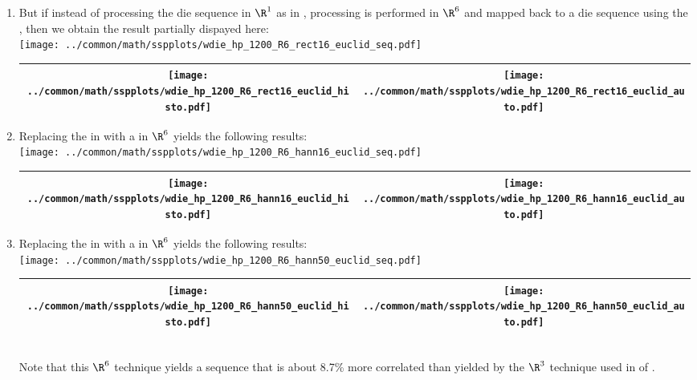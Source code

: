 \begin{example}
\begin{enumerate}
  \item \label{item:wdie_hp_R6_rect16_euclid}
        But if instead of processing the die sequence in $\R^1$ as in ,
        processing is performed in $\R^6$ 
        and mapped back to a die sequence using the ,
        then we obtain the result partially dispayed here:
        \\\texttt{[image: ../common/math/sspplots/wdie\_hp\_1200\_R6\_rect16\_euclid\_seq.pdf]}
        \\\begin{tabular}{|>{\scs}c|>{\scs}c|}
             \hline
             \texttt{[image: ../common/math/sspplots/wdie\_hp\_1200\_R6\_rect16\_euclid\_histo.pdf]}
            &\texttt{[image: ../common/math/sspplots/wdie\_hp\_1200\_R6\_rect16\_euclid\_auto.pdf]}
           \\\hline
        \end{tabular}

  \item \label{item:wdie_hp_R6_hann16_euclid}
        Replacing the  in 
        with a  in $\R^6$ yields the following results:
        \\\texttt{[image: ../common/math/sspplots/wdie\_hp\_1200\_R6\_hann16\_euclid\_seq.pdf]}
        \\\begin{tabular}{|>{\scs}c|>{\scs}c|}
             \hline
             \texttt{[image: ../common/math/sspplots/wdie\_hp\_1200\_R6\_hann16\_euclid\_histo.pdf]}
            &\texttt{[image: ../common/math/sspplots/wdie\_hp\_1200\_R6\_hann16\_euclid\_auto.pdf]}
           \\\hline
        \end{tabular}

  \item \label{item:wdie_hp_R6_hann50_euclid}
        Replacing the  in 
        with a  in $\R^6$ yields the following results:
        \\\texttt{[image: ../common/math/sspplots/wdie\_hp\_1200\_R6\_hann50\_euclid\_seq.pdf]}
        \\\begin{tabular}{|>{\scs}c|>{\scs}c|}
             \hline
             \texttt{[image: ../common/math/sspplots/wdie\_hp\_1200\_R6\_hann50\_euclid\_histo.pdf]}
            &\texttt{[image: ../common/math/sspplots/wdie\_hp\_1200\_R6\_hann50\_euclid\_auto.pdf]}
           \\\hline
        \end{tabular}\\
     Note that this $\R^6$ technique yields a sequence that is about 8.7\% more correlated than yielded by the $\R^3$ technique
     used in  of .


\end{enumerate}
\end{example}
